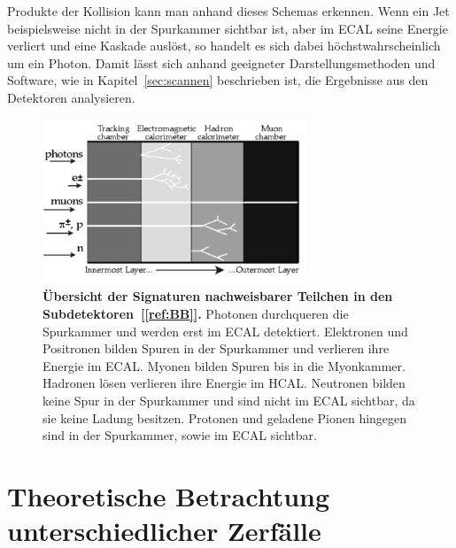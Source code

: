 \documentclass[a4paper,ngerman]{scrartcl}
\begin{document}
Produkte der Kollision kann man anhand dieses Schemas erkennen. 
Wenn ein Jet beispielsweise nicht in der Spurkammer sichtbar ist, aber im ECAL seine Energie verliert und eine Kaskade auslöst,
so handelt es sich dabei höchstwahrscheinlich um ein Photon.
Damit lässt sich anhand geeigneter Darstellungsmethoden und Software, wie in Kapitel~\ref{sec:scannen} beschrieben ist, die Ergebnisse aus den Detektoren analysieren.

\begin{figure}[tbh!]
\centering
\includegraphics[width=0.7\textwidth]{abbildungen/delphi_schichten.png}
\caption{\textbf{Übersicht der Signaturen nachweisbarer Teilchen in den Subdetektoren~[\ref{ref:BB}].} 
Photonen durchqueren die Spurkammer und werden erst im ECAL detektiert.
Elektronen und Positronen bilden Spuren in der Spurkammer und verlieren ihre Energie im ECAL.
Myonen bilden Spuren bis in die Myonkammer.
Hadronen lösen verlieren ihre Energie im HCAL.
Neutronen bilden keine Spur in der Spurkammer und sind nicht im ECAL sichtbar, da sie keine Ladung besitzen.
Protonen und geladene Pionen hingegen sind in der Spurkammer, sowie im ECAL sichtbar.
}
\label{fig:delphi_schichten}
\end{figure}


\section{Theoretische Betrachtung unterschiedlicher Zerfälle}
\label{sec:zerfaelle}
\end{document}
